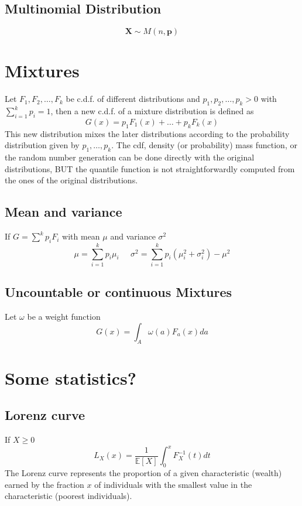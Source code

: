 \subsection{Multinomial Distribution}
\[ \textbf{X} \sim M(n,\textbf{p}) \]

\section{Mixtures}
Let $F_1,F_2,\dots,F_k$ be c.d.f. of different distributions and
$p_1,p_2,\dots,p_k>0$ with $\sum_{i=1}^kp_i=1$, then a new c.d.f. of a mixture
distribution is defined as
\[ G(x) = p_1F_1(x) + \dots + p_kF_k(x) \] This new distribution mixes the later
distributions according to the probability distribution given by
$p_1,\dots,p_k$. The cdf, density (or probability) mass function, or the random
number generation can be done directly with the original distributions, BUT the
quantile function is not straightforwardly computed from the ones of the original
distributions. 


\subsection{Mean and variance}
If $G=\sum^kp_iF_i$ with mean $\mu$ and variance $\sigma^2$
\[ \mu = \sum_{i=1}^k p_i\mu_i \;\;\;\;\;
    \sigma^2 = \sum_{i=1}^k p_i(\mu^2_i+\sigma^2_i)-\mu^2
\]

\subsection{Uncountable or continuous Mixtures}
Let $\omega$ be a weight function 
\[ G(x) = \int_A \omega(a)F_a(x)da \]

\section{Some statistics?}
\subsection{Lorenz curve}
If $X\geq 0$ 
\[ L_X(x) = \frac{1}{\mathbb{E}[X]}\int_0^x F^{-1}_X(t)dt \] The Lorenz curve
represents the proportion of a given characteristic (wealth) earned by the
fraction $x$ of individuals with the smallest value in the characteristic (poorest
individuals). 


